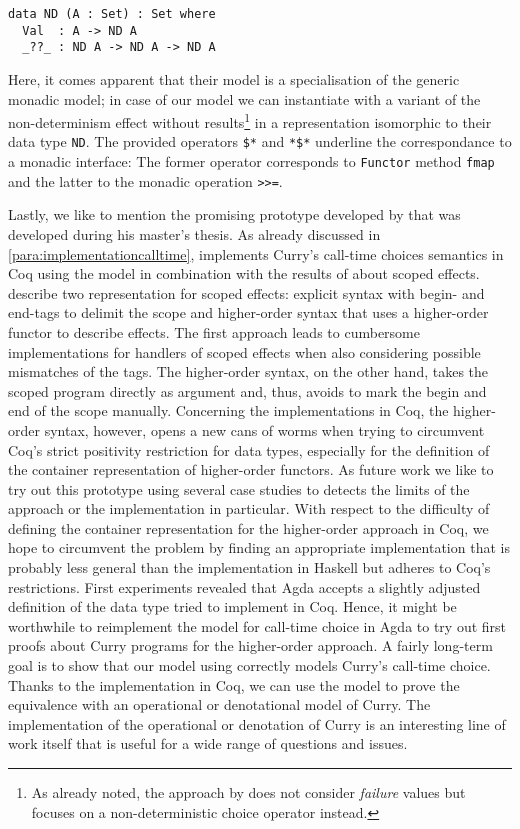 \begin{verbatim}
data ND (A : Set) : Set where
  Val  : A -> ND A
  _??_ : ND A -> ND A -> ND A
\end{verbatim}

Here, it comes apparent that their model is a specialisation of the
generic monadic model; in case of our model we can instantiate
 with a variant of the non-determinism effect 
without  results\footnote{As already noted, the approach
  by \citeauthor{antoy2017proving} does not consider \emph{failure}
  values but focuses on a non-deterministic choice operator instead.}
in a representation isomorphic to their data type \texttt{ND}.
The provided operators \texttt{\$*} and \texttt{*\$*} underline the
correspondance to a monadic interface: The former operator corresponds
to \texttt{Functor} method \texttt{fmap} and the latter to the monadic
operation \texttt{>>=}.

Lastly, we like to mention the promising prototype developed by
\citet{bunkenburg2019modeling} that was developed during his master's
thesis.
As already discussed in \autoref{para:implementationcalltime},
\citeauthor{bunkenburg2019modeling} implements Curry's call-time
choices semantics in Coq using the  model in combination
with the results of \citet{wu2014effect} about scoped effects.
\citeauthor{wu2014effect} describe two representation for scoped
effects: explicit syntax with begin- and end-tags to delimit the scope
and higher-order syntax that uses a higher-order functor to describe
effects.
The first approach leads to cumbersome implementations for handlers of
scoped effects when also considering possible mismatches of the tags.
The higher-order syntax, on the other hand, takes the scoped
program directly as argument and, thus, avoids to mark the begin and
end of the scope manually.
Concerning the implementations in Coq, the higher-order syntax,
however, opens a new cans of worms when trying to circumvent Coq's
strict positivity restriction for data types, especially for the
definition of the container representation of higher-order functors.
As future work we like to try out this prototype using several case
studies to detects the limits of the approach or the implementation in
particular.
With respect to the difficulty of defining the container
representation for the higher-order approach in Coq, we hope to
circumvent the problem by finding an appropriate implementation that
is probably less general than the implementation in Haskell but
adheres to Coq's restrictions.
First experiments revealed that Agda accepts a slightly adjusted
definition of the data type \citeauthor{bunkenburg2019modeling} tried
to implement in Coq.
Hence, it might be worthwhile to reimplement the model for call-time
choice in Agda to try out first proofs about Curry programs for the
higher-order approach.
A fairly long-term goal is to show that our model using 
correctly models Curry's call-time choice.
Thanks to the implementation in Coq, we can use the model to prove the
equivalence with an operational or denotational model of Curry.
The implementation of the operational or denotation of Curry is an
interesting line of work itself that is useful for a wide range of
questions and issues.


